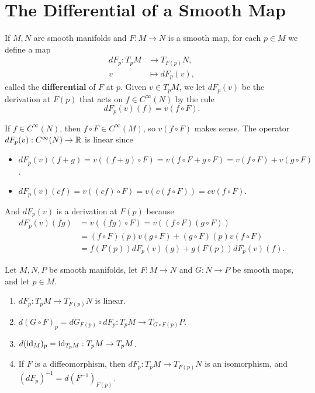 \section{The Differential of a Smooth Map}
\begin{definition}
    If $M,N$ are smooth manifolds and $F:M \to N$ is a smooth map, for each $p \in M$ we define a map 
    \begin{align*}
    dF_p: T_pM &\to T_{F(p)}N, \\
    v &\mapsto dF_p(v),
    \end{align*}
    called the \textbf{differential} of $F$ at $p$.
    Given $v \in T_p M$, we let $dF_p(v)$ be the derivation at $F(p)$ that acts on $f \in C^\infty(N)$ by the rule
\begin{equation}
    dF_p(v)(f) = v(f \circ F). 
\end{equation}
\end{definition}
If $f \in C^\infty(N)$, then $f \circ F \in C^\infty(M)$, so $v(f \circ F)$ makes sense. The operator $dF_p(v): C^\infty(N) \to \mathbb{R}$ is linear since
\begin{itemize}
    \item $dF_p(v)(f+g) = v((f+g)\circ F) = v(f \circ F + g \circ F) = v(f \circ F) + v(g \circ F)$. 
    \item $dF_p(v)(cf) = v((cf) \circ F) = v(c(f\circ F)) = cv(f \circ F)$.
\end{itemize}
And $dF_p(v)$ is a derivation at $F(p)$ because 
\begin{align*}
    dF_p(v)(fg)
    &= v((fg) \circ F) = v((f\circ F)(g\circ F)) \\
    &= (f \circ F)(p) v(g \circ F) + (g \circ F)(p) v(f \circ F) \\
    &= f(F(p)) dF_p(v)(g) + g(F(p)) dF_p(v)(f). 
\end{align*}
\begin{proposition}
    Let $M,N,P$ be smooth manifolds, let $F:M \to N$ and $G:N \to P$ be smooth maps, and let $p \in M$.
    \begin{enumerate}
    \item $dF_p: T_pM \to T_{F(p)}N$ is linear.
    \item $d(G \circ F)_p = d G_{F(p)} \circ dF_p: T_p M \to T_{G \circ F(p)}P$.
    \item $d(\mathrm{id}_M)_p = \mathrm{id}_{T_pM}: T_pM \to T_pM$.
    \item If $F$ is a diffeomorphism, then $dF_p: T_pM \to T_{F(p)}N$ is an isomorphism, and $(dF_p)^{-1} = d(F^{-1})_{F(p)}$.
    \end{enumerate}
\end{proposition}
